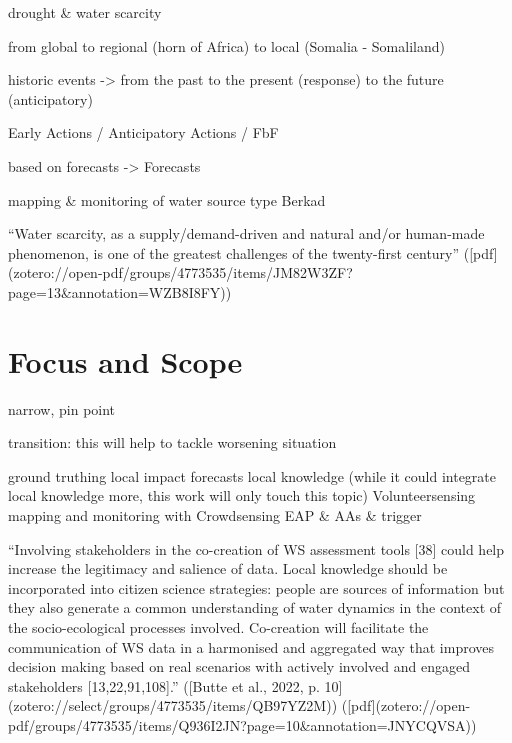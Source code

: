 drought & water scarcity


from global to regional (horn of Africa) to local (Somalia - Somaliland)


historic events -> from the past to the present (response) to the future (anticipatory)



Early Actions / Anticipatory Actions / FbF



based on forecasts -> Forecasts



mapping & monitoring of water source type Berkad


“Water scarcity, as a supply/demand-driven and natural and/or human-made phenomenon, is one of the greatest challenges of the twenty-first century” ([pdf](zotero://open-pdf/groups/4773535/items/JM82W3ZF?page=13&annotation=WZB8I8FY))

\section{Focus and Scope}
narrow, pin point


transition: this will help to tackle worsening situation


ground truthing
local impact forecasts
local knowledge (while it could integrate local knowledge more, this work will only touch this topic)
Volunteersensing
mapping and monitoring with Crowdsensing
EAP & AAs & trigger



“Involving stakeholders in the co-creation of WS assessment tools [38] could help increase the legitimacy and salience of data. Local knowledge should be incorporated into citizen science strategies: people are sources of information but they also generate a common understanding of water dynamics in the context of the socio-ecological processes involved. Co-creation will facilitate the communication of WS data in a harmonised and aggregated way that improves decision making based on real scenarios with actively involved and engaged stakeholders [13,22,91,108].” ([Butte et al., 2022, p. 10](zotero://select/groups/4773535/items/QB97YZ2M)) ([pdf](zotero://open-pdf/groups/4773535/items/Q936I2JN?page=10&annotation=JNYCQVSA))

